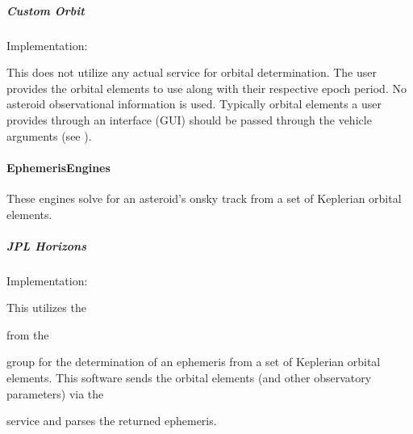 \documentclass[letterpaper,11pt,english]{sphinxmanual}
\begin{document}
\subparagraph{Custom Orbit}
\label{\detokenize{technical/architecture/services_engines:custom-orbit}}
\sphinxAtStartPar
Implementation: {\hyperref[\detokenize{code/opihiexarata.orbit.custom:opihiexarata.orbit.custom.CustomOrbitEngine}]{}}

\sphinxAtStartPar
This does not utilize any actual service for orbital determination. The user
provides the orbital elements to use along with their respective epoch period.
No asteroid observational information is used. Typically orbital elements a
user provides through an interface (GUI) should be passed through the
vehicle arguments (see {\hyperref[\detokenize{technical/architecture/services_engines:technical-architecture-services-engines}]{}}).


\paragraph{EphemerisEngines}
\label{\detokenize{technical/architecture/services_engines:ephemerisengines}}\label{\detokenize{technical/architecture/services_engines:technical-architecture-services-engines-ephemerisengines}}
\sphinxAtStartPar
These engines solve for an asteroid’s on\sphinxhyphen{}sky track from a set of
Keplerian orbital elements.


\subparagraph{JPL Horizons}
\label{\detokenize{technical/architecture/services_engines:jpl-horizons}}
\sphinxAtStartPar
Implementation: {\hyperref[\detokenize{code/opihiexarata.ephemeris.jplhorizons:opihiexarata.ephemeris.jplhorizons.JPLHorizonsWebAPIEngine}]{}}

\sphinxAtStartPar
This utilizes the %
\begin{footnote}[46]\sphinxAtStartFootnote
{}
%
\end{footnote}
from the %
\begin{footnote}[47]\sphinxAtStartFootnote
{}
%
\end{footnote} group for
the determination of an ephemeris from a set of Keplerian orbital elements.
This software sends the orbital elements (and other observatory parameters)
via the %
\begin{footnote}[48]\sphinxAtStartFootnote
{}
%
\end{footnote}
service and parses the returned ephemeris.
\end{document}
